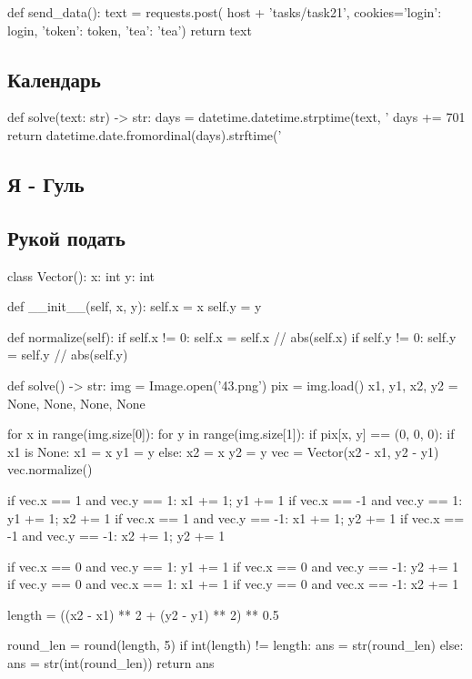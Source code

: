 \documentclass[12pt]{article}
\begin{document}
    \begin{pythoncode}
def send_data():
    text = requests.post(
        host + 'tasks/task21',
        cookies={'login': login, 'token': token, 'tea': 'tea'})
    return text
    \end{pythoncode}


    \subsection{Календарь}

    \begin{pythoncode}
def solve(text: str) -> str:
    days = datetime.datetime.strptime(text, '%
    days += 701
    return datetime.date.fromordinal(days).strftime('%
    \end{pythoncode}

    \subsection{Я - Гуль}


    \subsection{Рукой подать}

    \begin{pythoncode}
class Vector():
    x: int
    y: int

    def __init__(self, x, y):
        self.x = x
        self.y = y

    def normalize(self):
        if self.x != 0: self.x = self.x // abs(self.x)
        if self.y != 0: self.y = self.y // abs(self.y)

def solve() -> str:
    img = Image.open('43.png')
    pix = img.load()
    x1, y1, x2, y2 = None, None, None, None

    for x in range(img.size[0]):
        for y in range(img.size[1]):
            if pix[x, y] == (0, 0, 0):
                if x1 is None:
                    x1 = x
                    y1 = y
                else:
                    x2 = x
                    y2 = y
    vec = Vector(x2 - x1, y2 - y1)
    vec.normalize()

    if vec.x == 1 and vec.y == 1: x1 += 1; y1 += 1
    if vec.x == -1 and vec.y == 1: y1 += 1; x2 += 1
    if vec.x == 1 and vec.y == -1: x1 += 1; y2 += 1
    if vec.x == -1 and vec.y == -1: x2 += 1; y2 += 1

    if vec.x == 0 and vec.y == 1: y1 += 1
    if vec.x == 0 and vec.y == -1: y2 += 1
    if vec.y == 0 and vec.x == 1: x1 += 1
    if vec.y == 0 and vec.x == -1: x2 += 1

    length = ((x2 - x1) ** 2 + (y2 - y1) ** 2) ** 0.5

    round_len = round(length, 5)
    if int(length) != length:
        ans = str(round_len)
    else:
        ans = str(int(round_len))
    return ans
    \end{pythoncode}
\end{document}
